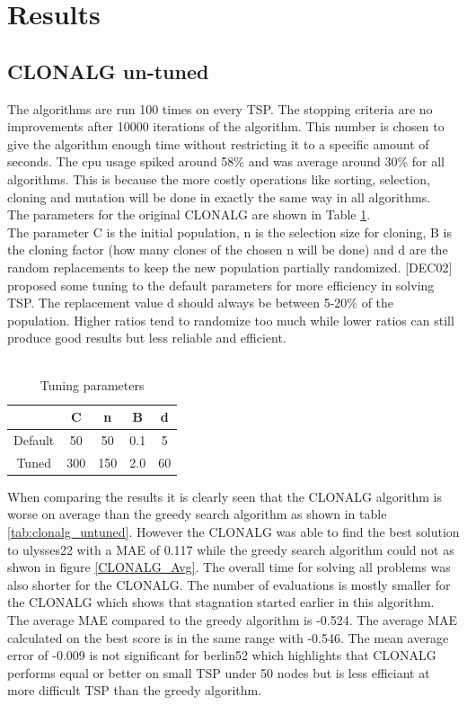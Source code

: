 \section{Results}
\subsection{CLONALG un-tuned}
The algorithms are run 100 times on every TSP. The stopping criteria are no improvements after 10000 iterations of the algorithm. This number is chosen to give the algorithm enough time without restricting it to a specific amount of seconds. The cpu usage spiked around 58\% and was average around 30\% for all algorithms. This is because the more costly operations like sorting, selection, cloning and mutation will be done in exactly the same way in all algorithms.\\
The parameters for the original CLONALG are shown in Table \ref{tuning}.\\
The parameter C is the initial population, n is the selection size for cloning, B is the cloning factor (how many clones of the chosen n will be done) and d are the random replacements to keep the new population partially randomized. [DEC02] proposed some tuning to the default parameters for more efficiency in solving TSP. The replacement value d should always be between 5-20\% of the population. Higher ratios tend to randomize too much while lower ratios can still produce good results but less reliable and efficient.\\\\
\begin{table}[H]
	\begin{tabular}{|c|c|c|c|c|}
		\hline
		& C   & n   & B   & d  \\ \hline
		Default & 50  & 50  & 0.1 & 5  \\ \hline
		Tuned   & 300 & 150 & 2.0 & 60 \\ \hline
	\end{tabular}
	\caption{Tuning parameters}
	\label{tuning}
\end{table} 
When comparing the results it is clearly seen that the CLONALG algorithm is worse on average than the greedy search algorithm as shown in table \ref{tab:clonalg_untuned}. However the CLONALG was able to find the best solution to ulysses22 with a MAE of 0.117 while the greedy search algorithm could not as shwon in figure \ref{CLONALG_Avg}. The overall time for solving all problems was also shorter for the CLONALG. The number of evaluations is mostly smaller for the CLONALG which shows that stagnation started earlier in this algorithm. The average MAE compared to the greedy algorithm is -0.524. The average MAE calculated on the best score is in the same range with -0.546. The mean average error of -0.009 is not significant for berlin52 which highlights that CLONALG performs equal or better on small TSP under 50 nodes but is less efficiant at more difficult TSP than the greedy algorithm.

